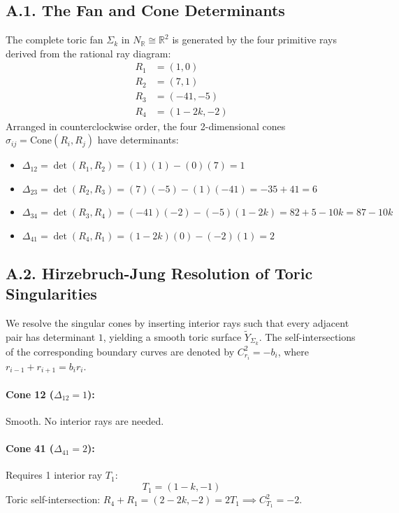 \documentclass[11pt, reqno]{amsart}
\theoremstyle{definition}
\begin{document}
\subsection*{A.1. The Fan and Cone Determinants}
The complete toric fan $\Sigma_k$ in $N_\mathbb{R} \cong \mathbb{R}^2$ is generated by the four primitive rays derived from the rational ray diagram:
\begin{align*}
    R_1 &= (1, 0) \\
    R_2 &= (7, 1) \\
    R_3 &= (-41, -5) \\
    R_4 &= (1 - 2k, -2)
\end{align*}
Arranged in counterclockwise order, the four 2-dimensional cones $\sigma_{ij} = \text{Cone}(R_i, R_j)$ have determinants:
\begin{itemize}
    \item $\Delta_{12} = \det(R_1, R_2) = (1)(1) - (0)(7) = 1$
    \item $\Delta_{23} = \det(R_2, R_3) = (7)(-5) - (1)(-41) = -35 + 41 = 6$
    \item $\Delta_{34} = \det(R_3, R_4) = (-41)(-2) - (-5)(1-2k) = 82 + 5 - 10k = 87 - 10k$
    \item $\Delta_{41} = \det(R_4, R_1) = (1-2k)(0) - (-2)(1) = 2$
\end{itemize}

\subsection*{A.2. Hirzebruch-Jung Resolution of Toric Singularities}
We resolve the singular cones by inserting interior rays such that every adjacent pair has determinant $1$, yielding a smooth toric surface $\widetilde{Y}_{\Sigma_k}$. The self-intersections of the corresponding boundary curves are denoted by $C_{r_i}^2 = -b_i$, where $r_{i-1} + r_{i+1} = b_i r_i$.

\paragraph{Cone 12 ($\Delta_{12} = 1$):} 
Smooth. No interior rays are needed.

\paragraph{Cone 41 ($\Delta_{41} = 2$):} 
Requires 1 interior ray $T_1$:
\begin{equation}
    T_1 = (1-k, -1)
\end{equation}
Toric self-intersection: $R_4 + R_1 = (2-2k, -2) = 2 T_1 \implies C_{T_1}^2 = -2$.
\end{document}
